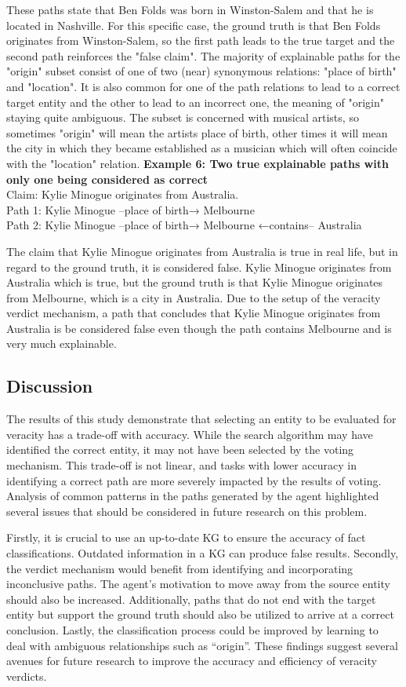 These paths state that Ben Folds was born in Winston-Salem and that he is located in Nashville. For this specific case, the ground truth is that Ben Folds originates from Winston-Salem, so the first path leads to the true target and the second path reinforces the "false claim".
The majority of explainable paths for the "origin" subset consist of one of two (near) synonymous relations: "place of birth" and "location".
It is also common for one of the path relations to lead to a correct target entity and the other to lead to an incorrect one, the meaning of "origin" staying quite ambiguous. The subset is concerned with musical artists, so sometimes "origin" will mean the artists place of birth, other times it will mean the city in which they became established as a musician which will often coincide with the "location" relation.
\newline
\textbf{Example 6: Two true explainable paths with only one being considered as correct}
\\Claim: Kylie Minogue originates from Australia.
\\Path 1: Kylie Minogue –place of birth→ Melbourne
\\Path 2: Kylie Minogue –place of birth→ Melbourne ←contains– Australia

\noindent The claim that Kylie Minogue originates from Australia is true in real life, but in regard to the ground truth, it is considered false.
Kylie Minogue originates from Australia which is true, but the ground truth is that Kylie Minogue originates from Melbourne, which is a city in Australia. Due to the setup of the veracity verdict mechanism, a path that concludes that Kylie Minogue originates from Australia is be considered false even though the path contains Melbourne and is very much explainable.

\subsection{Discussion}
\label{discuss}
The results of this study demonstrate that selecting an entity to be evaluated for veracity has a trade-off with accuracy. While the search algorithm may have identified the correct entity, it may not have been selected by the voting mechanism. This trade-off is not linear, and tasks with lower accuracy in identifying a correct path are more severely impacted by the results of voting. Analysis of common patterns in the paths generated by the agent highlighted several issues that should be considered in future research on this problem.

Firstly, it is crucial to use an up-to-date KG to ensure the accuracy of fact classifications. Outdated information in a KG can produce false results. Secondly, the verdict mechanism would benefit from identifying and incorporating inconclusive paths. The agent's motivation to move away from the source entity should also be increased. Additionally, paths that do not end with the target entity but support the ground truth should also be utilized to arrive at a correct conclusion. Lastly, the classification process could be improved by learning to deal with ambiguous relationships such as ``origin''. These findings suggest several avenues for future research to improve the accuracy and efficiency of veracity verdicts.
